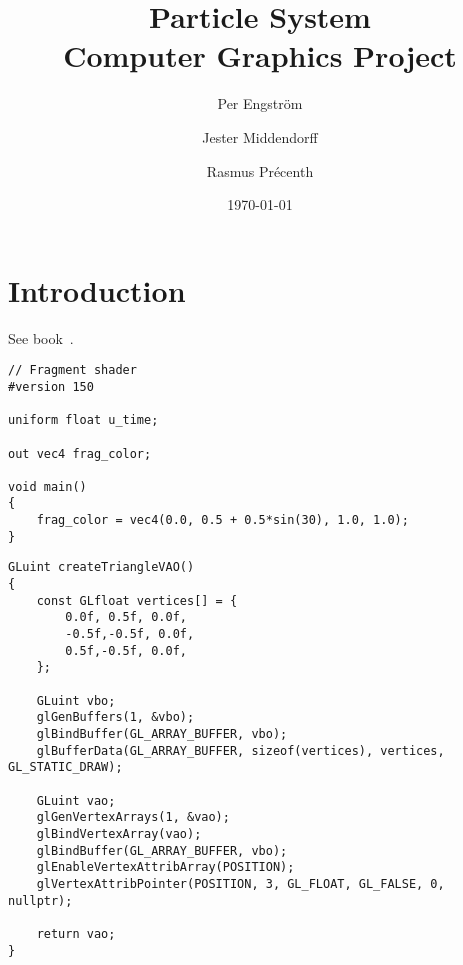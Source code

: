 \documentclass[a4paper]{scrartcl}
\title{\LARGE Particle System \\
    \normalfont \Large Computer Graphics Project}
\author{Per Engström \and Jester Middendorff \and Rasmus Précenth}
\date{\today}
\begin{document}
\thispagestyle{empty}

\maketitle

\section{Introduction}
\label{sec:introduction}

See book~\cite{coursebook}.

\begin{verbatim}
// Fragment shader
#version 150

uniform float u_time;

out vec4 frag_color;

void main()
{
    frag_color = vec4(0.0, 0.5 + 0.5*sin(30), 1.0, 1.0);
}
\end{verbatim}

\begin{verbatim}
GLuint createTriangleVAO()
{
    const GLfloat vertices[] = {
        0.0f, 0.5f, 0.0f,
        -0.5f,-0.5f, 0.0f,
        0.5f,-0.5f, 0.0f,
    };

    GLuint vbo;
    glGenBuffers(1, &vbo);
    glBindBuffer(GL_ARRAY_BUFFER, vbo);
    glBufferData(GL_ARRAY_BUFFER, sizeof(vertices), vertices, GL_STATIC_DRAW);

    GLuint vao;
    glGenVertexArrays(1, &vao);
    glBindVertexArray(vao);
    glBindBuffer(GL_ARRAY_BUFFER, vbo);
    glEnableVertexAttribArray(POSITION);
    glVertexAttribPointer(POSITION, 3, GL_FLOAT, GL_FALSE, 0, nullptr);

    return vao;
}
\end{verbatim}

\printbibliography
\end{document}
